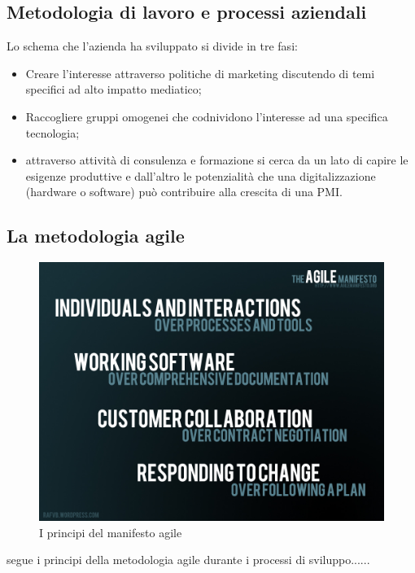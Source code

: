 \subsection{Metodologia di lavoro e processi aziendali}
Lo schema che l'azienda ha sviluppato si divide in tre fasi:
\begin{itemize}
\item Creare l’interesse attraverso politiche di marketing discutendo di temi specifici ad alto impatto mediatico;
\item Raccogliere gruppi omogenei che codnividono l'interesse ad una specifica tecnologia;
\item attraverso attività di consulenza e formazione si cerca da un lato di capire le esigenze produttive e dall’altro le potenzialità che una digitalizzazione (hardware o software) può contribuire alla crescita di una PMI.
\end{itemize}

\subsection{La metodologia agile}
\begin{figure}[H]
	\begin{center}
	\includegraphics[scale=0.25]{immagini/agile_manifesto.jpg}
	\caption{I principi del manifesto agile}
	\end{center}
\end{figure}
\lab{} segue i principi della metodologia agile durante i processi di sviluppo......



